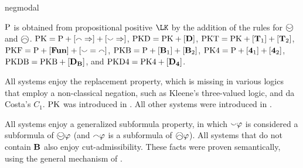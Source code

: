 \begin{entry}{negmodal}
\begin{calculus}
\end{calculus}


 \begin{clarifications}
 ${\rm {P}}$ is obtained from propositional positive $\LK$
 by the addition of the rules for $\wsmile$ and $\wfrown$.
 {${\rm {PK}}={\rm {P}}+[{\smallfrown}\Rightarrow]+[{\smallsmile}\Rightarrow]$,}
 {${\rm {PKD}}={\rm {PK}}+[{\bf D}]$,}
 {${\rm {PKT}}={\rm {PK}}+[{\bf T}_{1}]+[{\bf T}_{2}]$,}
 {${\rm {PKF}}={\rm {P}}+[{\bf Fun}]+[{\smallsmile}={\smallfrown}]$,}
 {${\rm {PKB}}={\rm {P}}+[{\bf B}_{1}]+[{\bf B}_{2}]$,}
 {${\rm {PK4}}={\rm {P}}+[{\bf 4}_{1}]+[{\bf 4}_{2}]$,}
 {${\rm {PKDB}}={\rm {PKB}}+[{\bf D}_{{\bf B}}]$,} and
 {${\rm {PKD4}}={\rm {PK4}}+[{\bf D}_{{\bf 4}}]$.}

 \end{clarifications}

 \begin{history}
All systems enjoy the replacement property,
 which is missing in various logics that employ a non-classical negation,
 such as Kleene's three-valued logic, and da Costa's $C_{1}$.
${\rm {PK}}$ was introduced in \cite{dod:mar:ENTCS2013}. All other systems were introduced in \cite{Lahav2017}.
 \end{history}

 \begin{technicalities}
All systems enjoy a generalized subformula property,
in which ${\smallsmile}\varphi$ is considered a subformula of $\wsmile\varphi$
(and ${\smallfrown}\varphi$ is a subformula of $\wfrown\varphi$).
All systems that do not contain ${\bf B}$ also enjoy
cut-admissibility.
These facts were proven semantically, using
the general mechanism of \cite{Lahav:2013:USF:2555591.2528930}.
 \end{technicalities}



\end{entry}
